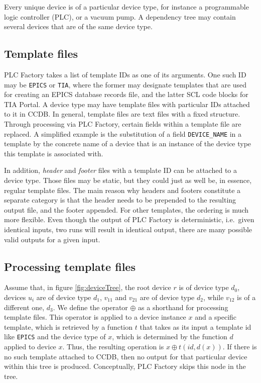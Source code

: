 \documentclass[a4paper,
              ]{jacow}
\begin{document}
Every unique device is of a particular device type, for instance a programmable logic controller (PLC), or a vacuum pump. A dependency tree may contain several devices that are of the same device type.

\subsection{Template files}
PLC Factory takes a list of template IDs as one of its arguments. One such ID may be \texttt{EPICS} or \texttt{TIA}, where the former may designate templates that are used for creating an EPICS database records file, and the latter SCL code blocks for TIA Portal. A device type may have template files with particular IDs attached to it in CCDB. In general, template files are text files with a fixed structure. Through processing via PLC Factory, certain fields within a template file are replaced. A simplified example is the substitution of a field \texttt{DEVICE\_NAME} in a template by the concrete name of a device that is an instance of the device type this template is associated with.

In addition, \emph{header} and \emph{footer} files with a template ID can be attached to a device type. Those files may be static, but they could just as well be, in essence, regular template files. The main reason why headers and footers constitute a separate category is that the header needs to be prepended to the resulting output file, and the footer appended. For other templates, the ordering is much more flexible. Even though the output of PLC Factory is deterministic, i.e.\ given identical inputs, two runs will result in identical output, there are many possible valid outputs for a given input.

\subsection{Processing template files}
Assume that, in figure \ref{fig:deviceTree}, the root device $r$ is of device type $d_0$, devices $u_i$ are of device type $d_1$, $v_{11}$ and $v_{21}$ are of device type $d_2$, while $v_{12}$ is of a different one, $d_3$. We define the operator $\oplus$ as a shorthand for processing template files. This operator is applied to a device instance $x$ and a specific template, which is retrieved by a function $t$ that takes as its input a template id like \texttt{EPICS} and the device type of $x$, which is determined by the function $d$ applied to device $x$. Thus, the resulting operation is $x \oplus t(\mathit{id}, d(x))$. If there is no such template attached to CCDB, then no output for that particular device within this tree is produced. Conceptually, PLC Factory skips this node in the tree.
\end{document}
